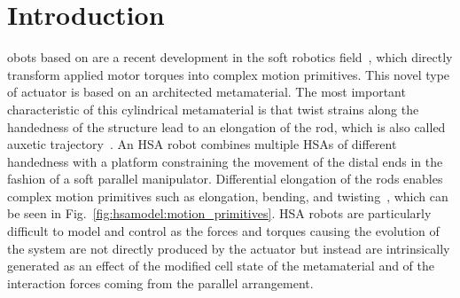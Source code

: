 \section{Introduction}\label{sec:hsamodel:introduction}


obots based on  are a recent development in the soft robotics field~\citep{chin2018compliant, truby2021recipe, zhang2022vision, lipton2018handedness, chin2019automated}, which directly transform applied motor torques into complex motion primitives.
%
This novel type of actuator is based on an architected metamaterial. The most important characteristic of this cylindrical metamaterial is that twist strains along the handedness of the structure lead to an elongation of the rod, which is also called auxetic trajectory~\citep{good2022expanding}. 
An \gls{HSA} robot combines multiple \glspl{HSA} of different handedness with a platform constraining the movement of the distal ends in the fashion of a soft parallel manipulator. 
Differential elongation of the rods enables complex motion primitives such as elongation, bending, and twisting~\citep{chin2018compliant}, which can be seen in Fig.~\ref{fig:hsamodel:motion_primitives}. %
\gls{HSA} robots are particularly difficult to model and control as the forces and torques causing the evolution of the system are not directly produced by the actuator but instead are intrinsically generated as an effect of the modified cell state of the metamaterial and of the interaction forces coming from the parallel arrangement.

